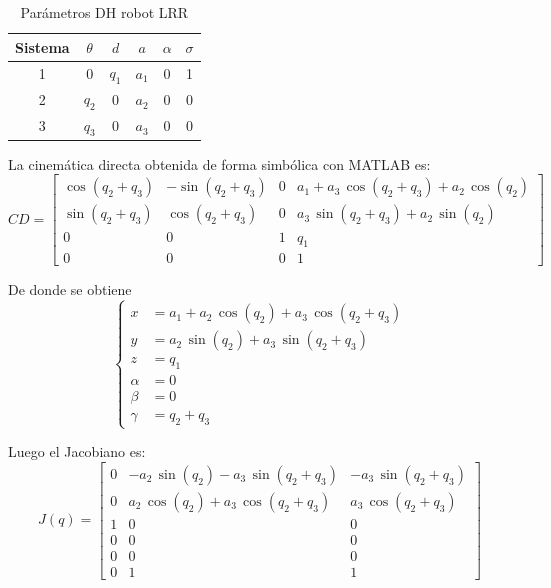 \documentclass[a4paper,12pt]{article}
\begin{document}
\begin{table}[H]
    \centering
    \begin{tabular}{|c|c|c|c|c|c|}
    \hline
    Sistema & $\theta$  & $d$ & $a$         & $\alpha$ & $\sigma$ \\ \hline
    1       & $0$       & $q_1$ & $a_{1}$  & 0      & 1        \\ \hline
    2       & $q_2$     & 0   & $a_{2}$  & 0        & 0        \\ \hline
    3       & $q_3$     & 0   & $a_{3}$  & 0        & 0        \\ \hline
    \end{tabular}
    \caption{Parámetros DH robot LRR}
\end{table}

La cinemática directa obtenida de forma simbólica con MATLAB es:
\begin{equation*}
    CD = \left[\begin{array}{cccc} \cos\left(q_{2}+q_{3}\right) & -\sin\left(q_{2}+q_{3}\right) & 0 & a_{1}+a_{3}\,\cos\left(q_{2}+q_{3}\right)+a_{2}\,\cos\left(q_{2}\right)\\ \sin\left(q_{2}+q_{3}\right) & \cos\left(q_{2}+q_{3}\right) & 0 & a_{3}\,\sin\left(q_{2}+q_{3}\right)+a_{2}\,\sin\left(q_{2}\right)\\ 0 & 0 & 1 & q_{1}\\ 0 & 0 & 0 & 1 \end{array}\right]
\end{equation*}

De donde se obtiene
\begin{equation*}
    \left\{
        \begin{aligned}
            x &= a_1 +  a_2\,\cos(q_2) + a_3\,\cos(q_2 + q_3)\\
            y &= a_2\,\sin(q_2) + a_3\,\sin(q_2 + q_3)\\
            z &= q_1\\
            \alpha &= 0\\
            \beta  &= 0\\
            \gamma &= q_2 + q_3
        \end{aligned}
    \right.
\end{equation*}

Luego el Jacobiano es:
\begin{equation}
    J(q) = 
    \begin{bmatrix}
        0 & -a_2\,\sin(q_2) - a_3\,\sin(q_2 + q_3) & -a_3\,\sin(q_2 + q_3)\\
        0 & a_2\,\cos(q_2) + a_3\,\cos(q_2 + q_3)  & a_3\,\cos(q_2 + q_3)\\
        1 & 0 & 0 \\
        0 & 0 & 0 \\
        0 & 0 & 0 \\
        0 & 1 & 1
    \end{bmatrix}
\end{equation}
\end{document}
